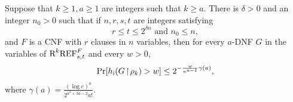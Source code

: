\begin{theorem}
\label{thm:switching_a-DNFs_to_trees}
Suppose that $k \geq 1,a \geq 1$ are integers such that $k \geq a$. There is $\delta > 0$ and an integer $n_0 > 0$ such that if $n,r,s,t$ are integers satisfying 
\begin{equation}
\label{eq:conditions_n,r,t_in_switching_theorem} 
r \leq t \leq 2^{\delta n} \text{ and } n_0 \leq n,
\end{equation} 
and $F$ is a CNF with $r$ clauses in $n$ variables, then for every $a$-DNF $G$ in the variables of $\textnormal{R}^k\textnormal{REF}^{F}_{s,t}$ and every $w>0$, 
\begin{equation}
\label{eqn:probability_p_a_w}
\Pr[h_{\textnormal{i}}(G \! \restriction \! \rho_k) > w] \leq 2^{- \frac{w}{n^{a-1}} \gamma(a)},
\end{equation}
where $\gamma(a) = \frac{(\log e)^a}{2^{a^2 + 3a -2} a!}$.
\end{theorem}


